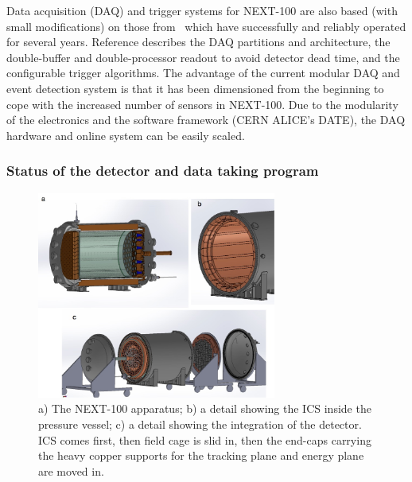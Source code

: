 \indent

Data acquisition (DAQ) and trigger systems for NEXT-100 are also based (with small modifications) on those from \NEW\, which have successfully and reliably operated for several years. Reference \cite{Esteve:2021a} describes the DAQ partitions and architecture, the double-buffer and double-processor readout to avoid detector dead time, and the configurable trigger algorithms. The advantage of the current modular DAQ and event detection system is that it has been dimensioned from the beginning to cope with the increased number of sensors in NEXT-100. Due to the modularity of the electronics and the software framework (CERN ALICE's DATE), the DAQ hardware and online system can be easily scaled.

\subsubsection{Status of the detector and data taking program}

\begin{figure}[!htb]
\centering
\includegraphics[width=0.7\textwidth]{img2/Next100Collage.jpg}
\caption{\small a) The NEXT-100 apparatus; b) a detail showing the ICS inside the pressure vessel; c) a detail showing the integration of the detector. ICS comes first, then field cage is slid in, then the end-caps carrying the heavy copper supports for the tracking plane and energy plane are moved in.} 
\label{fig.n100e}
\end{figure} 



